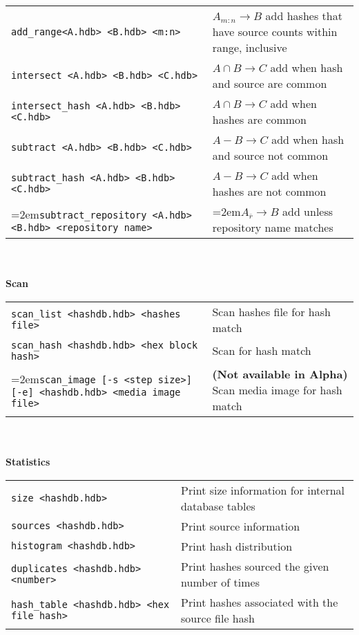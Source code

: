 \begin{footnotesize}
\begin{tabular}{p{3.6 in} p{3.0 in}}
\texttt{add\_range<A.hdb> <B.hdb> <m:n>} & $A_{m:n} \rightarrow B$ add hashes that have source counts within range, inclusive\\
\texttt{intersect <A.hdb> <B.hdb> <C.hdb>} & $A \cap B \rightarrow C$ add when hash and source are common\\
\texttt{intersect\_hash <A.hdb> <B.hdb> <C.hdb>} & $A \cap B \rightarrow C$ add when hashes are common\\
\texttt{subtract <A.hdb> <B.hdb> <C.hdb>} & $A - B \rightarrow C$ add when hash and source not common\\
\texttt{subtract\_hash <A.hdb> <B.hdb> <C.hdb>} & $A - B \rightarrow C$ add when hashes are not common\\
\hangindent=2em\texttt{subtract\_repository <A.hdb> <B.hdb> <repository name>} & \hangindent=2em$A_{\overline{r}} \rightarrow B$ add unless repository name matches\\
\end{tabular}
\\
\\
\textbf{Scan} \\
\begin{tabular}{p{3.6 in} p{3.0 in}}
\texttt{scan\_list <hashdb.hdb> <hashes file>} & Scan hashes file for hash match \\
\texttt{scan\_hash <hashdb.hdb> <hex block hash>} & Scan for hash match \\
\hangindent=2em\texttt{scan\_image [-s <step size>] [-e] <hashdb.hdb> <media image file>} & \textbf{(Not available in Alpha)} Scan media image for hash match \\
\end{tabular}
\\
\\
\textbf{Statistics}\\
\begin{tabular}{p{3.6 in} p{3.0 in}}
\texttt{size <hashdb.hdb>} & Print size information for internal database tables \\
\texttt{sources <hashdb.hdb>} & Print source information \\
\texttt{histogram <hashdb.hdb>} & Print hash distribution \\
\texttt{duplicates <hashdb.hdb> <number>} & Print hashes sourced the given number of times \\
\texttt{hash\_table <hashdb.hdb> <hex file hash>} & Print hashes associated with the source file hash\\
\end{tabular}

\end{footnotesize}
